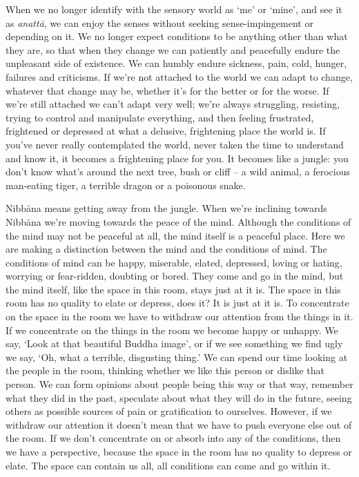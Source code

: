 When we no longer identify with the sensory world as `me' or `mine', and see it as \textit{anatt\=a}, we can enjoy the senses without seeking sense-impingement or depending on it. We no longer expect conditions to be anything other than what they are, so that when they change we can patiently and peacefully endure the unpleasant side of existence. We can humbly endure sickness, pain, cold, hunger, failures and criticisms. If we're not attached to the world we can adapt to change, whatever that change may be, whether it's for the better or for the worse. If we're still attached we can't adapt very well; we're always struggling, resisting, trying to control and manipulate everything, and then feeling frustrated, frightened or depressed at what a delusive, frightening place the world is. If you've never really contemplated the world, never taken the time to understand and know it, it becomes a frightening place for you. It becomes like a jungle: you don't know what's around the next tree, bush or cliff -- a wild animal, a ferocious man-eating tiger, a terrible dragon or a poisonous snake.

Nibb\=ana means getting away from the jungle. When we're inclining towards Nibb\=ana we're moving towards the peace of the mind. Although the conditions of the mind may not be peaceful at all, the mind itself is a peaceful place. Here we are making a distinction between the mind and the conditions of mind. The conditions of mind can be happy, miserable, elated, depressed, loving or hating, worrying or fear-ridden, doubting or bored. They come and go in the mind, but the mind itself, like the space in this room, stays just at it is. The space in this room has no quality to elate or depress, does it? It is just at it is. To concentrate on the space in the room we have to withdraw our attention from the things in it. If we concentrate on the things in the room we become happy or unhappy. We say, `Look at that beautiful Buddha image', or if we see something we find ugly we say, `Oh, what a terrible, disgusting thing.' We can spend our time looking at the people in the room, thinking whether we like this person or dislike that person. We can form opinions about people being this way or that way, remember what they did in the past, speculate about what they will do in the future, seeing others as possible sources of pain or gratification to ourselves. However, if we withdraw our attention it doesn't mean that we have to push everyone else out of the room. If we don't concentrate on or absorb into any of the conditions, then we have a perspective, because the space in the room has no quality to depress or elate. The space can contain us all, all conditions can come and go within it.

